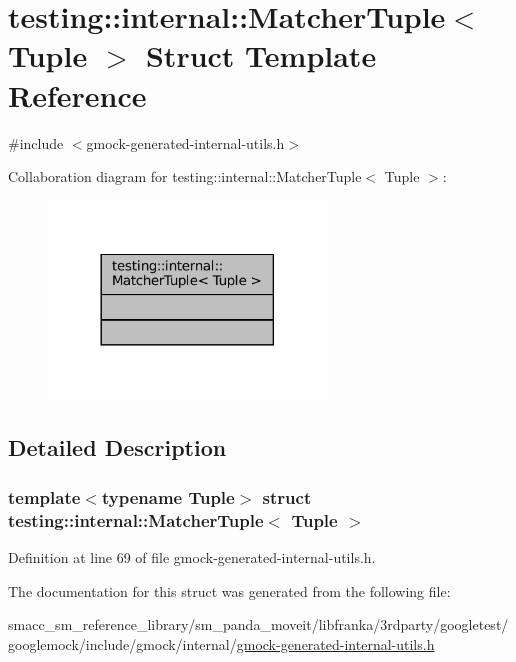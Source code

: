 \hypertarget{structtesting_1_1internal_1_1MatcherTuple}{}\section{testing\+:\+:internal\+:\+:Matcher\+Tuple$<$ Tuple $>$ Struct Template Reference}
\label{structtesting_1_1internal_1_1MatcherTuple}


{\ttfamily \#include $<$gmock-\/generated-\/internal-\/utils.\+h$>$}



Collaboration diagram for testing\+:\+:internal\+:\+:Matcher\+Tuple$<$ Tuple $>$\+:
\nopagebreak
\begin{figure}[H]
\begin{center}
\leavevmode
\includegraphics[width=209pt]{structtesting_1_1internal_1_1MatcherTuple__coll__graph}
\end{center}
\end{figure}


\subsection{Detailed Description}
\subsubsection*{template$<$typename Tuple$>$\newline
struct testing\+::internal\+::\+Matcher\+Tuple$<$ Tuple $>$}



Definition at line 69 of file gmock-\/generated-\/internal-\/utils.\+h.



The documentation for this struct was generated from the following file\+:\begin{DoxyCompactItemize}
\item 
smacc\+\_\+sm\+\_\+reference\+\_\+library/sm\+\_\+panda\+\_\+moveit/libfranka/3rdparty/googletest/googlemock/include/gmock/internal/\hyperlink{gmock-generated-internal-utils_8h}{gmock-\/generated-\/internal-\/utils.\+h}\end{DoxyCompactItemize}
